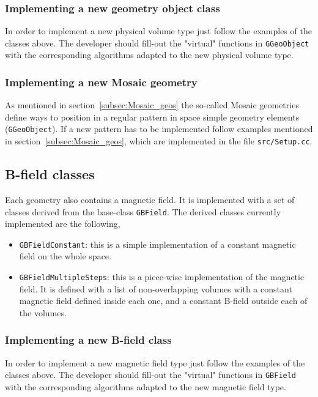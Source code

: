 \subsubsection{Implementing a new geometry object class}

In order to implement a new physical volume type just follow the examples of the classes above. The developer should fill-out the "virtual" functions in {\tt GGeoObject} with the 
corresponding algorithms adapted to the new physical volume type.

\subsubsection{Implementing a new Mosaic geometry}

As mentioned in section~\ref{subsec:Mosaic_geos} the so-called Mosaic geometries define ways to position in a regular pattern in space simple geometry elements ({\tt GGeoObject}). 
If a new pattern has to be implemented follow examples mentioned in section~\ref{subsec:Mosaic_geos}, which are implemented in the file {\tt src/Setup.cc}.


\subsection{B-field classes}
\label{subsec:Bfield_tools}

Each geometry also contains a magnetic field. It is implemented with a set of classes derived from the base-class {\tt GBField}. The derived classes currently implemented 
are the following,

\begin{itemize}
  \item  {\tt GBFieldConstant}: this is a simple implementation of a constant magnetic field on the whole space.
  
  \item  {\tt GBFieldMultipleSteps}: this is a piece-wise implementation of the magnetic field. It is defined with a list of non-overlapping volumes 
  with a constant magnetic field defined inside each one, and a constant B-field outside each of the volumes.
\end{itemize}

\subsubsection{Implementing a new B-field class}

In order to implement a new magnetic field type just follow the examples of the classes above. The developer should fill-out the "virtual" functions in {\tt GBField} with the 
corresponding algorithms adapted to the new magnetic field type.

